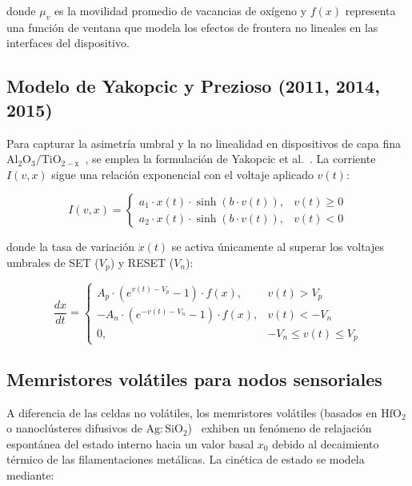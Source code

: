 donde $\mu_v$ es la movilidad promedio de vacancias de oxígeno y $f(x)$ representa una función de ventana que modela los efectos de frontera no lineales en las interfaces del dispositivo.

\subsection{Modelo de Yakopcic y Prezioso (2011, 2014, 2015)}
\label{subsec:marco-yakopcic}

Para capturar la asimetría umbral y la no linealidad en dispositivos de capa fina $\mathrm{Al_2O_3/TiO_{2-x}}$~\cite{prezioso2014, prezioso2015}, se emplea la formulación de Yakopcic et al.~\cite{yakopcic2011}. La corriente $I(v, x)$ sigue una relación exponencial con el voltaje aplicado $v(t)$:

\begin{equation}
I(v, x) = 
\begin{cases}
a_1 \cdot x(t) \cdot \sinh(b \cdot v(t)), & v(t) \geq 0 \\
a_2 \cdot x(t) \cdot \sinh(b \cdot v(t)), & v(t) < 0
\end{cases}
\label{eq:yakopcic-iv}
\end{equation}

donde la tasa de variación $\dot{x}(t)$ se activa únicamente al superar los voltajes umbrales de SET ($V_p$) y RESET ($V_n$):

\begin{equation}
\frac{dx}{dt} = 
\begin{cases}
A_p \cdot \left( e^{v(t) - V_p} - 1 \right) \cdot f(x), & v(t) > V_p \\
-A_n \cdot \left( e^{-v(t) - V_n} - 1 \right) \cdot f(x), & v(t) < -V_n \\
0, & -V_n \leq v(t) \leq V_p
\end{cases}
\label{eq:yakopcic-dxdt}
\end{equation}

\subsection{Memristores volátiles para nodos sensoriales}
\label{subsec:marco-volatile}

A diferencia de las celdas no volátiles, los memristores volátiles (basados en $\mathrm{HfO_2}$ o nanoclústeres difusivos de $\mathrm{Ag:SiO_2}$)~\cite{wang2025, yang2017} exhiben un fenómeno de relajación espontánea del estado interno hacia un valor basal $x_0$ debido al decaimiento térmico de las filamentaciones metálicas. La cinética de estado se modela mediante:

